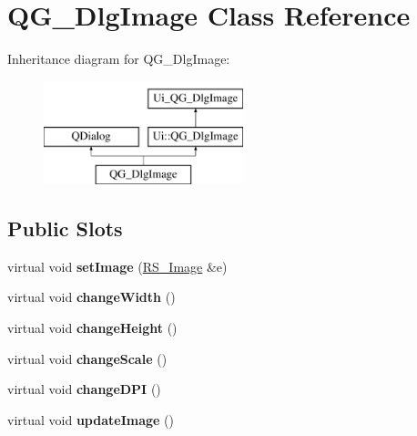 \hypertarget{classQG__DlgImage}{\section{Q\-G\-\_\-\-Dlg\-Image Class Reference}
\label{classQG__DlgImage}
}
Inheritance diagram for Q\-G\-\_\-\-Dlg\-Image\-:\begin{figure}[H]
\begin{center}
\leavevmode
\includegraphics[height=3.000000cm]{classQG__DlgImage}
\end{center}
\end{figure}
\subsection*{Public Slots}
\begin{DoxyCompactItemize}
\item 
\hypertarget{classQG__DlgImage_ac1240ec62b302a0fbdbad9cab8ec3636}{virtual void {\bfseries set\-Image} (\hyperlink{classRS__Image}{R\-S\-\_\-\-Image} \&e)}\label{classQG__DlgImage_ac1240ec62b302a0fbdbad9cab8ec3636}

\item 
\hypertarget{classQG__DlgImage_a1ec0dd8b011a4f0bdff2598b17a844e5}{virtual void {\bfseries change\-Width} ()}\label{classQG__DlgImage_a1ec0dd8b011a4f0bdff2598b17a844e5}

\item 
\hypertarget{classQG__DlgImage_aed1707c5b2d073b9d4ecd665caaea639}{virtual void {\bfseries change\-Height} ()}\label{classQG__DlgImage_aed1707c5b2d073b9d4ecd665caaea639}

\item 
\hypertarget{classQG__DlgImage_a27d2a4bfd312fc4db8754405d174e819}{virtual void {\bfseries change\-Scale} ()}\label{classQG__DlgImage_a27d2a4bfd312fc4db8754405d174e819}

\item 
\hypertarget{classQG__DlgImage_aa7cbdd62a61edb18d0e16a115e612bbb}{virtual void {\bfseries change\-D\-P\-I} ()}\label{classQG__DlgImage_aa7cbdd62a61edb18d0e16a115e612bbb}

\item 
\hypertarget{classQG__DlgImage_adc6423ee52fe9b72f7fd004746a620a1}{virtual void {\bfseries update\-Image} ()}\label{classQG__DlgImage_adc6423ee52fe9b72f7fd004746a620a1}

\end{DoxyCompactItemize}
